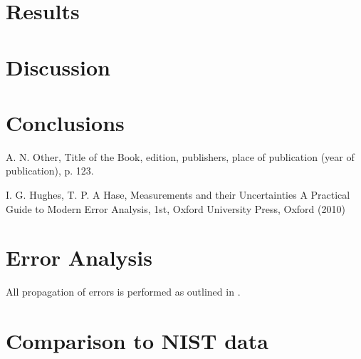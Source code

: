 \documentclass[10pt, twocolumn]{revtex4}    %
\begin{document}
\section{Results} \label{s:results}

\section{Discussion} \label{s:analysis}


\section{Conclusions} \label{s:conclusions}

\begin{thebibliography}{}

 A. N. Other, Title of the Book, edition, publishers, place of publication (year of publication), p. 123.   %

I. G. Hughes, T. P. A Hase, Measurements and their Uncertainties A Practical Guide to Modern Error Analysis, 1st, Oxford University Press, Oxford (2010)

\end{thebibliography} 

\clearpage
\appendix
\section{Error Analysis} \label{a:errors}
All propagation of errors is performed as outlined in \cite{errors}.

\clearpage
\section{Comparison to NIST data} \label{a:NIST}
\end{document}
